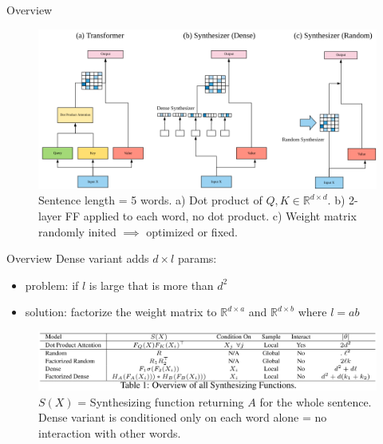 \documentclass{beamer}
\begin{document}
\begin{frame}{Overview}

\begin{figure}[h]
\includegraphics[width=\textwidth]{img/arch}
\caption{Sentence length = 5 words. a) Dot product of $Q, K \in \mathbb{R}^{d \times d}$. \newline b) 2-layer FF applied to each word, no dot product. \newline c) Weight matrix randomly inited $\implies$ optimized or fixed.}
\end{figure}

\end{frame}
\begin{frame}{Overview}
Dense variant adds $d \times l$ params:
\begin{itemize}
\item problem: if $l$ is large that is more than $d^2$
\item solution: factorize the weight matrix to $\mathbb{R}^{d \times a}$ and $\mathbb{R}^{d \times b}$ where $l = ab$
\end{itemize}

\vfill

\begin{figure}[h]
\includegraphics[width=\textwidth]{img/funcs}
\caption{$S(X)$ = Synthesizing function returning $A$ for the whole sentence. Dense variant is conditioned only on each word alone = no interaction with other words.}
\end{figure}

\end{frame}
\end{document}
